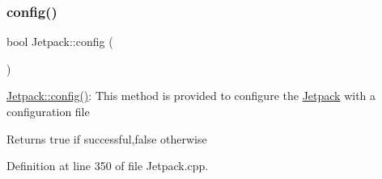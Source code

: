\subsubsection{\texorpdfstring{config()}{config()}}
{\footnotesize\ttfamily bool Jetpack\+::config (\begin{DoxyParamCaption}{ }\end{DoxyParamCaption})}

\hyperlink{class_jetpack_ab065ee83e244265a2223a22f3ee4a719}{Jetpack\+::config()}\+: This method is provided to configure the \hyperlink{class_jetpack}{Jetpack} with a configuration file

\begin{DoxyReturn}{Returns}
true if successful,false otherwise 
\end{DoxyReturn}


Definition at line 350 of file Jetpack.\+cpp.


